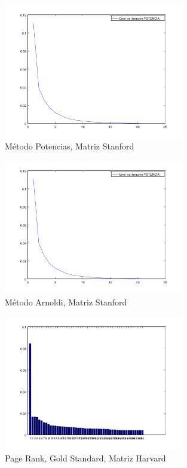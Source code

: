 \documentclass{article}
\begin{document}
\begin{figure}[p]
  \caption{Método Potencias, Matriz Stanford}
  \centering
    \includegraphics[width=0.7\textwidth]{ErrorVsIteracionPotencia-Stanford.png}
\end{figure}
\begin{figure}[p]
\label{fig:arnoStan}
  \caption{Método Arnoldi, Matriz Stanford}
  \centering
    \includegraphics[width=0.7\textwidth]{ErrorVsIteracionPotencia-Stanford.png}
\end{figure}
\begin{figure}[p]
\label{fig:PRHA}
  \caption{Page Rank, Gold Standard, Matriz Harvard}
  \centering
    \includegraphics[width=0.7\textwidth]{PageRank-GoldStandard-Harvard.png}
\end{figure}
\end{document}
